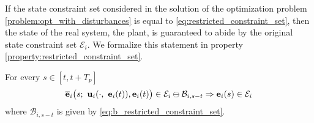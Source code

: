 If the state constraint set considered in the solution of the optimization
problem \eqref{problem:opt_with_disturbances} is equal to
\eqref{eq:restricted_constraint_set}, then the state of the real system,
the plant, is guaranteed to abide by the original state constraint set
$\mathcal{E}_i$. We formalize this statement in property
\eqref{property:restricted_constraint_set}.

\begin{bw_box}
  \begin{property}
  \label{property:restricted_constraint_set}

  For every $s \in [t, t + T_p]$
  \begin{align}
    \overline{\bm{\mathbf{e}}}_i\big( s;\ \bm{\mathbf{u}}_i(\cdot,\ \bm{\mathbf{e}}_i(t)), \bm{\mathbf{e}}_i(t) \big) \in \mathcal{E}_i \ominus \mathcal{B}_{i,s-t}
    \Rightarrow
    \bm{\mathbf{e}}_i(s) \in \mathcal{E}_i
  \end{align}
  where $\mathcal{B}_{i,s-t}$ is given by \eqref{eq:b_restricted_constraint_set}.
\end{property}
\end{bw_box}

